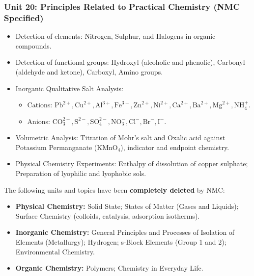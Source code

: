 \documentclass[11pt,a4paper]{article}
\begin{document}
\subsubsection{Unit 20: Principles Related to Practical Chemistry (NMC Specified)}
\begin{itemize}
  \item Detection of elements: Nitrogen, Sulphur, and Halogens in organic compounds.
  \item Detection of functional groups: Hydroxyl (alcoholic and phenolic), Carbonyl (aldehyde and ketone), Carboxyl, Amino groups.
  \item Inorganic Qualitative Salt Analysis:
  \begin{itemize}
    \item Cations: $\text{Pb}^{2+}, \text{Cu}^{2+}, \text{Al}^{3+}, \text{Fe}^{3+}, \text{Zn}^{2+}, \text{Ni}^{2+}, \text{Ca}^{2+}, \text{Ba}^{2+}, \text{Mg}^{2+}, \text{NH}_4^+$.
    \item Anions: $\text{CO}_3^{2-}, \text{S}^{2-}, \text{SO}_4^{2-}, \text{NO}_3^-, \text{Cl}^-, \text{Br}^-, \text{I}^-$.
  \end{itemize}
  \item Volumetric Analysis: Titration of Mohr's salt and Oxalic acid against Potassium Permanganate ($\text{KMnO}_4$), indicator and endpoint chemistry.
  \item Physical Chemistry Experiments: Enthalpy of dissolution of copper sulphate; Preparation of lyophilic and lyophobic sols.
\end{itemize}

\begin{trapbox}
The following units and topics have been \textbf{completely deleted} by NMC:
\begin{itemize}
  \item \textbf{Physical Chemistry:} Solid State; States of Matter (Gases and Liquids); Surface Chemistry (colloids, catalysis, adsorption isotherms).
  \item \textbf{Inorganic Chemistry:} General Principles and Processes of Isolation of Elements (Metallurgy); Hydrogen; s-Block Elements (Group 1 and 2); Environmental Chemistry.
  \item \textbf{Organic Chemistry:} Polymers; Chemistry in Everyday Life.
\end{itemize}
\end{trapbox}

\newpage

\end{document}
